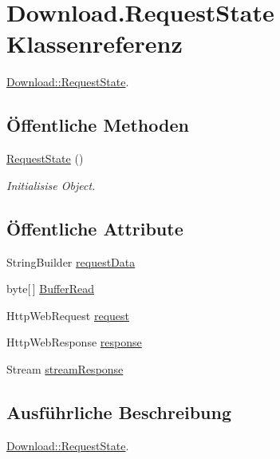 \hypertarget{class_download_1_1_request_state}{\section{Download.\-Request\-State Klassenreferenz}
\label{class_download_1_1_request_state}
}


\hyperlink{class_download_1_1_request_state}{Download\-::\-Request\-State}.  


\subsection*{Öffentliche Methoden}
\begin{DoxyCompactItemize}
\item 
\hypertarget{class_download_1_1_request_state_aecc11124306e2d34e3d7d139571098f6}{\hyperlink{class_download_1_1_request_state_aecc11124306e2d34e3d7d139571098f6}{Request\-State} ()}\label{class_download_1_1_request_state_aecc11124306e2d34e3d7d139571098f6}

\begin{DoxyCompactList}\small\item\em Initialisise Object. \end{DoxyCompactList}\end{DoxyCompactItemize}
\subsection*{Öffentliche Attribute}
\begin{DoxyCompactItemize}
\item 
String\-Builder \hyperlink{class_download_1_1_request_state_ab20c7c09c5efb2e831d8157ac2fea1ae}{request\-Data}
\item 
byte\mbox{[}$\,$\mbox{]} \hyperlink{class_download_1_1_request_state_aec613e05d7ced342aa5d6fb28aff5bc7}{Buffer\-Read}
\item 
Http\-Web\-Request \hyperlink{class_download_1_1_request_state_a0a74186a43e3ed603eb2236b08ecd753}{request}
\item 
Http\-Web\-Response \hyperlink{class_download_1_1_request_state_af85537a87aa3c35d8cc1058e143f4201}{response}
\item 
Stream \hyperlink{class_download_1_1_request_state_a30cef36e2cceb6a4e1b2a446247e60be}{stream\-Response}
\end{DoxyCompactItemize}


\subsection{Ausführliche Beschreibung}
\hyperlink{class_download_1_1_request_state}{Download\-::\-Request\-State}. 

